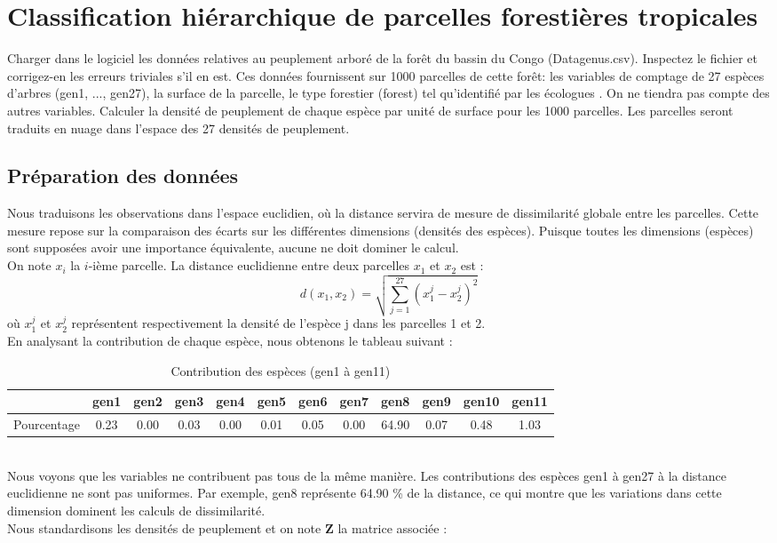 \documentclass{article}
\begin{document}
\section{Classification hiérarchique de parcelles forestières tropicales}
Charger dans le logiciel les données relatives au peuplement arboré de la forêt du bassin du Congo
(Datagenus.csv). Inspectez le fichier et corrigez-en les erreurs triviales s'il en est. Ces données fournissent
sur 1000 parcelles de cette forêt: les variables de comptage de 27 espèces d'arbres (gen1, ..., gen27), la
surface de la parcelle, le type forestier (forest) tel qu'identifié par les écologues . On ne tiendra pas compte
des autres variables. Calculer la densité de peuplement de chaque espèce par unité de surface pour les 1000
parcelles. Les parcelles seront traduits en nuage dans l'espace des 27 densités de peuplement.

\subsection{Préparation des données}
\label{Q1}
Nous traduisons les observations dans l’espace euclidien, où la distance servira de mesure de dissimilarité globale entre les parcelles. Cette mesure repose sur la comparaison des écarts sur les différentes dimensions (densités des espèces). Puisque toutes les dimensions (espèces) sont supposées avoir une importance équivalente, aucune ne doit dominer le calcul.
\\
On note $x_i$ la $i$-ième parcelle. La distance euclidienne entre deux parcelles $x_1$ et $x_2$ est :  
\[
d(x_1, x_2) = \sqrt{\sum_{j=1}^{27} (x_1^j - x_2^j)^2}
\]
où \( x_1^j \) et \( x_2^j \) représentent respectivement la densité de l'espèce j dans les parcelles 1 et 2.
\\
En analysant la contribution de chaque espèce, nous obtenons le tableau suivant :
\begin{table}[h!]
    \centering
    \caption{Contribution des espèces (gen1 à gen11)}
    \label{tab:pourcentage}
    \begin{tabular}{@{}l*{11}{c}@{}}
    \toprule
     & gen1 & gen2 & gen3 & gen4 & gen5 & gen6 & gen7 & gen8 & gen9 & gen10 & gen11 \\ 
    \midrule
    Pourcentage & 
    0.23 & 0.00 & 0.03 & 0.00 & 0.01 & 0.05 & 0.00 & 64.90 & 0.07 & 0.48 & 1.03 \\ 
    \bottomrule
    \end{tabular}
    \end{table}
\\
Nous voyons que les variables ne contribuent pas tous de la même manière. Les contributions des espèces gen1 à gen27 à la distance euclidienne ne sont pas uniformes. Par exemple, gen8 représente 64.90 \% de la distance, ce qui montre que les variations dans cette dimension dominent les calculs de dissimilarité.
\\
Nous standardisons les densités de peuplement et on note \( \mathbf{Z} \) la matrice associée :
\end{document}

